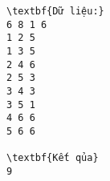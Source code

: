 \begin{verbatim}
\textbf{Dữ liệu:}
6 8 1 6
1 2 5
1 3 5
2 4 6
2 5 3
3 4 3
3 5 1
4 6 6
5 6 6

\textbf{Kết qủa}
9
\end{verbatim}